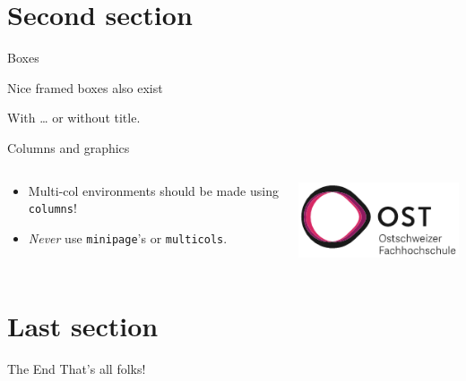 \documentclass[aspectratio=169]{beamer}    %
\begin{document}
	\section{Second section}
	\begin{frame}{Boxes}
		\begin{OSTBox}{}
			Nice framed boxes also exist
		\end{OSTBox}
		\begin{OSTBox}{With \dots}
			or without title.
		\end{OSTBox}
	\end{frame}
	\begin{frame}{Columns and graphics}
		\begin{columns}[onlytextwidth]
			\begin{column}{0.5\textwidth}
				\begin{itemize}
					\item Multi-col environments should be made using \texttt{columns}!
					\item \emph{Never} use \texttt{minipage}'s or \texttt{multicols}.
				\end{itemize}
			\end{column}
			\begin{column}{0.5\textwidth}
				\centering
				\includegraphics[width=0.8\linewidth]{header/OSTLogo.png}
			\end{column}
		\end{columns}
	\end{frame}

	\section{Last section}
	\begin{frame}{The End}
		\centering
		\LARGE That's all folks!
	\end{frame}
	
\end{document}
